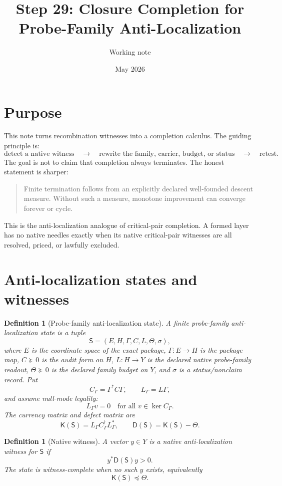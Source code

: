\documentclass[11pt]{article}
\title{Step 29: Closure Completion for Probe-Family Anti-Localization}
\author{Working note}
\date{May 2026}
\newtheorem{definition}[theorem]{Definition}
\newcommand{\K}{\mathsf K}
\newcommand{\D}{\mathsf D}
\newcommand{\Sstate}{\mathsf S}
\newcommand{\pre}{\preceq}
\newcommand{\suc}{\succeq}
\begin{document}
\maketitle

\section{Purpose}

This note turns recombination witnesses into a completion calculus.  The guiding principle is:
\[
\text{detect a native witness}
\quad\longrightarrow\quad
\text{rewrite the family, carrier, budget, or status}
\quad\longrightarrow\quad
\text{retest.}
\]
The goal is not to claim that completion always terminates.  The honest statement is sharper:
\begin{quote}
Finite termination follows from an explicitly declared well-founded descent measure.  Without such a measure, monotone improvement can converge forever or cycle.
\end{quote}
This is the anti-localization analogue of critical-pair completion.  A formed layer has no native needles exactly when its native critical-pair witnesses are all resolved, priced, or lawfully excluded.

\section{Anti-localization states and witnesses}

\begin{definition}[Probe-family anti-localization state]
A finite probe-family anti-localization state is a tuple
\[
\Sstate=(E,H,\Gamma,C,L,\Theta,\sigma),
\]
where $E$ is the coordinate space of the exact package, $\Gamma:E\to H$ is the package map, $C\suc0$ is the audit form on $H$, $L:H\to Y$ is the declared native probe-family readout, $\Theta\suc0$ is the declared family budget on $Y$, and $\sigma$ is a status/nonclaim record.  Put
\[
C_\Gamma=\Gamma^*C\Gamma,\qquad L_\Gamma=L\Gamma,
\]
and assume null-mode legality:
\[
L_\Gamma v=0\quad \text{for all }v\in\ker C_\Gamma.
\]
The currency matrix and defect matrix are
\[
\K(\Sstate)=L_\Gamma C_\Gamma^\dagger L_\Gamma^*,
\qquad
\D(\Sstate)=\K(\Sstate)-\Theta.
\]
\end{definition}

\begin{definition}[Native witness]
A vector $y\in Y$ is a native anti-localization witness for $\Sstate$ if
\[
y^*\D(\Sstate)y>0.
\]
The state is witness-complete when no such $y$ exists, equivalently
\[
\K(\Sstate)\pre\Theta.
\]
\end{definition}
\end{document}
